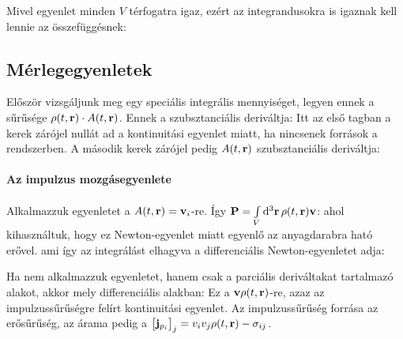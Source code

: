     Mivel  egyenlet minden $V$ térfogatra igaz, ezért az integrandusokra is igaznak kell lennie az összefüggésnek:
   
  \subsection{Mérlegegyenletek}
   
   Először vizsgáljunk meg egy speciális integrális mennyiséget, legyen ennek a sűrűsége $\rho(t,\mathbf{r})\cdot A(t,\mathbf{r})$. Ennek a szubsztanciális deriváltja:
   Itt az első tagban a kerek zárójel nullát ad a kontinuitási egyenlet miatt, ha nincsenek források a rendszerben. A második kerek zárójel pedig $A(t,\mathbf{r})$ szubsztanciális deriváltja:
   
   \paragraph{Az impulzus mozgásegyenlete}
    
    Alkalmazzuk  egyenletet a $A(t,\mathbf{r})=\mathbf{v}_i$-re. Így $\mathbf{P}=\int\limits_{V}^{}\mathrm{d}^3\mathbf{r}\,\rho(t,\mathbf{r})\mathbf{v}$:
    ahol kihasználtuk, hogy ez Newton-egyenlet miatt egyenlő az anyagdarabra ható erővel. ami így az integrálást elhagyva a differenciális Newton-egyenletet adja:
    
    Ha nem alkalmazzuk  egyenletet, hanem csak a parciális deriváltakat tartalmazó alakot, akkor 
    mely differenciális alakban:
    Ez a $\mathbf{v}\rho(t,\mathbf{r})$-re, azaz az impulzussűrűségre felírt kontinuitási egyenlet. Az impulzussűrűség forrása az erősűrűség, az árama pedig a $\big[\mathbf{j}_{p_i}\big]_j=v_iv_j \rho(t,\mathbf{r})-\sigma_{ij}$.
    
